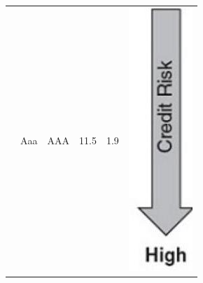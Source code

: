 \documentclass[11pt]{article}
\begin{document}
\begin{center}
\begin{tabular}{|c|c|c|c|c|c|}
{} & Aaa & AAA & 11.5 & 1.9 & \multirow{10}{*}{\includegraphics[max width=\textwidth]{2024_04_10_a4f1ca289b861eaba170g-2(1)}
}
\end{tabular}
\end{center}
\end{document}
